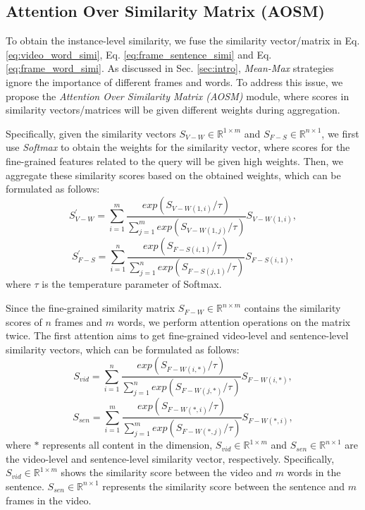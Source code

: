 \documentclass[sigconf]{acmart}
\begin{document}
\subsection{Attention Over Similarity Matrix (AOSM)} \label{sec:attention}

To obtain the instance-level similarity, we fuse the similarity vector/matrix in Eq. \ref{eq:video_word_simi}, Eq. \ref{eq:frame_sentence_simi} and Eq. \ref{eq:frame_word_simi}. 
As discussed in Sec. \ref{sec:intro}, \emph{Mean-Max} strategies \cite{yao2021filip,khattab2020colbert,santhanam2021colbertv2,khattab2021relevance} ignore the importance of different frames and words. To address this issue, we propose the \emph{Attention Over Similarity Matrix (AOSM)} module, where scores in similarity vectors/matrices will be given different weights during aggregation.

Specifically, given the similarity vectors $S_{V-W} \in \mathbb{R}^{1 \times m}$ and $S_{F-S} \in \mathbb{R}^{n \times 1}$, we first use \emph{Softmax} to obtain the weights for the similarity vector, where scores for the fine-grained features related to the query will be given high weights. Then, we aggregate these similarity scores based on the obtained weights, which can be formulated as follows:
\begin{equation}
    S^{\prime}_{V-W}=\sum _{i=1} ^m \frac{exp(S_{V-W (1,i)}/\tau) }{\sum _{j=1} ^m exp(S_{V-W (1,j)}/\tau)} S_{V-W (1,i)}, 
\label{eq:attention_list1}
\end{equation}
\begin{equation}
    S^{\prime}_{F-S}=\sum _{i=1} ^n \frac{exp(S_{F-S (i,1)}/\tau) }{\sum _{j=1} ^n exp(S_{F-S (j,1)}/\tau)} S_{F-S (i,1)},
\label{eq:attention_list2}
\end{equation}
where $\tau$ is the temperature parameter of Softmax.

Since the fine-grained similarity matrix $S_{F-W} \in \mathbb{R}^{n \times m}$ contains the similarity scores of $n$ frames and $m$ words, we perform attention operations on the matrix twice. The first attention aims to get fine-grained video-level and sentence-level similarity vectors, which can be formulated as follows:
\begin{equation}
    S_{vid}=\sum _{i=1} ^n \frac{exp(S_{F-W (i,*)}/\tau) }{\sum _{j=1} ^n exp(S_{F-W (j,*)}/\tau)} S_{F-W (i,*)},
\label{eq:attention_video}
\end{equation}
\begin{equation}
    S_{sen}=\sum _{i=1} ^m \frac{exp(S_{F-W (*,i)}/\tau) }{\sum _{j=1} ^m exp(S_{F-W (*,j)}/\tau)} S_{F-W (*,i)}, 
\label{eq:attention_sentence}
\end{equation}
where $*$ represents all content in the dimension, $S_{vid} \in \mathbb{R}^{1 \times m}$ and $S_{sen} \in \mathbb{R}^{n \times 1}$ are the video-level and sentence-level similarity vector, respectively. Specifically, $S_{vid} \in \mathbb{R}^{1 \times m}$ shows the similarity score between the video and $m$ words in the sentence.  $S_{sen} \in \mathbb{R}^{n \times 1}$ represents the similarity score between the sentence and $m$ frames in the video.
\end{document}
